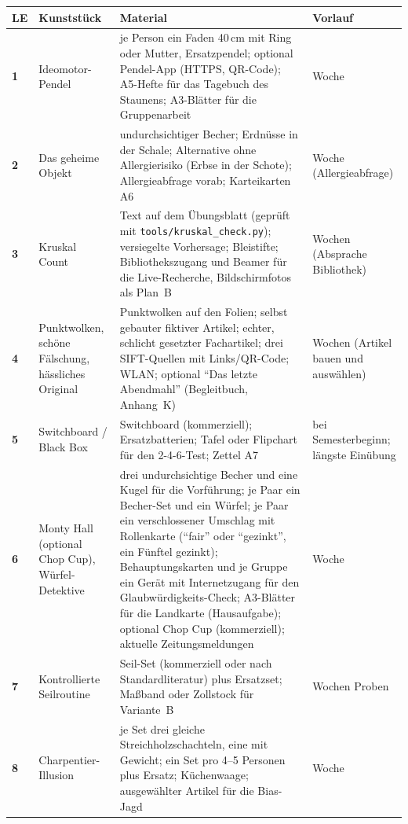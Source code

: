 {\small
\renewcommand{\arraystretch}{1.25}
\begin{longtable}{@{}>{\bfseries\color{rwuviolet}}p{7mm}>{\raggedright\arraybackslash}p{}>{\raggedright\arraybackslash}p{}>{\raggedright\arraybackslash}p{}@{}}
\toprule
\rowcolor{rwuviolet}\color{white}LE & \color{white}\textbf{Kunststück} & \color{white}\textbf{Material} & \color{white}\textbf{Vorlauf} \\
\midrule
\endhead
1 & Ideomotor-Pendel & je Person ein Faden 40\,cm mit Ring oder Mutter, Ersatzpendel; optional Pendel-App (HTTPS, QR-Code); A5-Hefte für das Tagebuch des Staunens; A3-Blätter für die Gruppenarbeit & 1 Woche \\
2 & Das geheime Objekt & undurchsichtiger Becher; Erdnüsse in der Schale; Alternative ohne Allergierisiko (Erbse in der Schote); Allergieabfrage vorab; Karteikarten A6 & 1 Woche (Allergieabfrage) \\
3 & Kruskal Count & Text auf dem Übungsblatt (geprüft mit \texttt{tools/kruskal\_check.py}); versiegelte Vorhersage; Bleistifte; Bibliothekszugang und Beamer für die Live-Recherche, Bildschirmfotos als Plan~B & 2 Wochen (Absprache Bibliothek) \\
4 & Punktwolken, schöne Fälschung, hässliches Original & Punktwolken auf den Folien; selbst gebauter fiktiver Artikel; echter, schlicht gesetzter Fachartikel; drei SIFT-Quellen mit Links/QR-Code; WLAN; optional \enquote{Das letzte Abendmahl} (Begleitbuch, Anhang~K) & 2 Wochen (Artikel bauen und auswählen) \\
5 & Switchboard / Black Box & Switchboard (kommerziell); Ersatzbatterien; Tafel oder Flipchart für den 2-4-6-Test; Zettel A7 & bei Semesterbeginn; längste Einübung \\
6 & Monty Hall (optional Chop Cup), Würfel-Detektive & drei undurchsichtige Becher und eine Kugel für die Vorführung; je Paar ein Becher-Set und ein Würfel; je Paar ein verschlossener Umschlag mit Rollenkarte (\enquote{fair} oder \enquote{gezinkt}, ein Fünftel gezinkt); Behauptungskarten und je Gruppe ein Gerät mit Internetzugang für den Glaubwürdigkeits-Check; A3-Blätter für die Landkarte (Hausaufgabe); optional Chop Cup (kommerziell); aktuelle Zeitungsmeldungen & 1 Woche \\
7 & Kontrollierte Seilroutine & Seil-Set (kommerziell oder nach Standardliteratur) plus Ersatzset; Maßband oder Zollstock für Variante~B & 2 Wochen Proben \\
8 & Charpentier-Illusion & je Set drei gleiche Streichholzschachteln, eine mit Gewicht; ein Set pro 4--5 Personen plus Ersatz; Küchenwaage; ausgewählter Artikel für die Bias-Jagd & 1 Woche \\

\end{longtable}}
